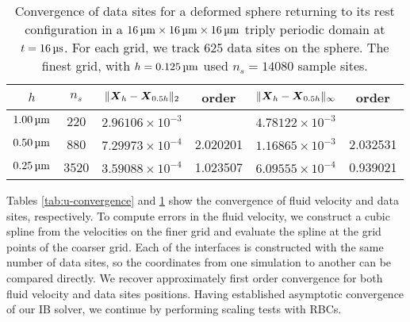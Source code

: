 \begin{table}
    \begin{center}
        \begingroup
        \setlength{\tabcolsep}{9pt}
        \renewcommand{\arraystretch}{1.5}
        \begin{tabular}{cc|cc|cc}
                                                                                                             \\ \toprule
            $h$       & $n_s$ & $\|\boldsymbol{X}_h-\boldsymbol{X}_{0.5h}\|_2$ & order    & $\|\boldsymbol{X}_h-\boldsymbol{X}_{0.5h}\|_{\infty}$ & order    \\ \midrule
            $1.00\um$ & 220   & $2.96106\times10^{-3}$ &          & $4.78122\times10^{-3}$        &          \\
            $0.50\um$ & 880   & $7.29973\times10^{-4}$ & 2.020201 & $1.16865\times10^{-3}$        & 2.032531 \\
            $0.25\um$ & 3520  & $3.59088\times10^{-4}$ & 1.023507 & $6.09555\times10^{-4}$        & 0.939021 \\ \bottomrule
        \end{tabular}
        \endgroup
    \end{center}
    \caption{%
Convergence of data sites for a deformed sphere returning to its rest
configuration in a $16\um\times16\um\times16\um$ triply periodic domain at
$t=16\us$. For each grid, we track 625 data sites on the sphere. The finest
grid, with $h = 0.125\um$ used $n_s=14080$ sample sites.
    }
    \label{tab:x-convergence}
\end{table}

Tables \ref{tab:u-convergence} and \ref{tab:x-convergence} show the convergence
of fluid velocity and data sites, respectively. To compute errors in the fluid
velocity, we construct a cubic spline from the velocities on the finer grid
and evaluate the spline at the grid points of the coarser grid. Each of the
interfaces is constructed with the same number of data sites, so the
coordinates from one simulation to another can be compared directly. We recover
approximately first order convergence for both fluid velocity and data sites
positions. Having established asymptotic convergence of our IB solver, we
continue by performing scaling tests with RBCs.
